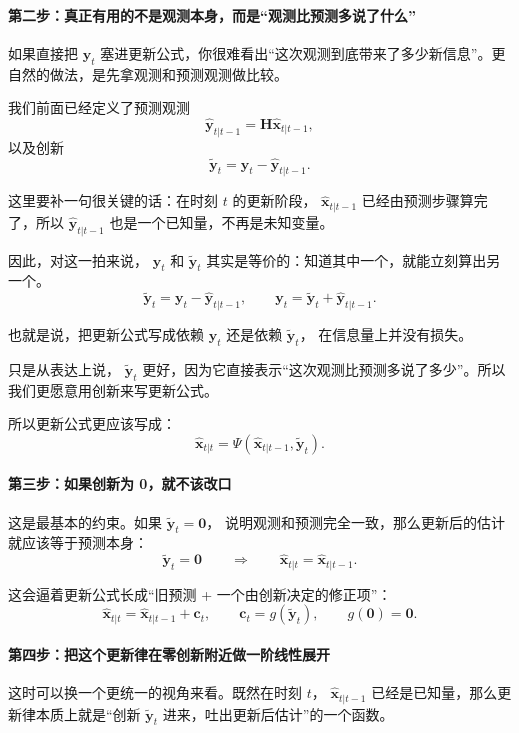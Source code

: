 \documentclass[12pt,a4paper]{ctexart}
\begin{document}
\paragraph{第二步：真正有用的不是观测本身，而是“观测比预测多说了什么”}

如果直接把
\(\bm{y}_t\)
塞进更新公式，你很难看出“这次观测到底带来了多少新信息”。更自然的做法，是先拿观测和预测观测做比较。

我们前面已经定义了预测观测
\[
\hat{\bm{y}}_{t|t-1} = \bm{H}\hat{\bm{x}}_{t|t-1},
\]
以及创新
\[
\tilde{\bm{y}}_t = \bm{y}_t - \hat{\bm{y}}_{t|t-1}.
\]

这里要补一句很关键的话：在时刻 \(t\) 的更新阶段，
\(\hat{\bm{x}}_{t|t-1}\)
已经由预测步骤算完了，所以
\(\hat{\bm{y}}_{t|t-1}\)
也是一个已知量，不再是未知变量。

因此，对这一拍来说，
\(\bm{y}_t\)
和
\(\tilde{\bm{y}}_t\)
其实是等价的：知道其中一个，就能立刻算出另一个。
\[
\tilde{\bm{y}}_t = \bm{y}_t - \hat{\bm{y}}_{t|t-1},
\qquad
\bm{y}_t = \tilde{\bm{y}}_t + \hat{\bm{y}}_{t|t-1}.
\]

也就是说，把更新公式写成依赖
\(\bm{y}_t\)
还是依赖
\(\tilde{\bm{y}}_t\)，
在信息量上并没有损失。

只是从表达上说，
\(\tilde{\bm{y}}_t\)
更好，因为它直接表示“这次观测比预测多说了多少”。所以我们更愿意用创新来写更新公式。

所以更新公式更应该写成：
\[
\hat{\bm{x}}_{t|t} = \Psi(\hat{\bm{x}}_{t|t-1}, \tilde{\bm{y}}_t).
\]

\paragraph{第三步：如果创新为 0，就不该改口}

这是最基本的约束。如果
\(\tilde{\bm{y}}_t=\bm{0}\)，
说明观测和预测完全一致，那么更新后的估计就应该等于预测本身：
\[
\tilde{\bm{y}}_t = \bm{0}
\qquad\Longrightarrow\qquad
\hat{\bm{x}}_{t|t} = \hat{\bm{x}}_{t|t-1}.
\]

这会逼着更新公式长成“旧预测 + 一个由创新决定的修正项”：
\[
\hat{\bm{x}}_{t|t}
= \hat{\bm{x}}_{t|t-1} + \bm{c}_t,
\qquad
\bm{c}_t = g(\tilde{\bm{y}}_t),
\qquad
g(\bm{0})=\bm{0}.
\]

\paragraph{第四步：把这个更新律在零创新附近做一阶线性展开}

这时可以换一个更统一的视角来看。既然在时刻 \(t\)，
\(\hat{\bm{x}}_{t|t-1}\)
已经是已知量，那么更新律本质上就是“创新 \(\tilde{\bm{y}}_t\) 进来，吐出更新后估计”的一个函数。
\end{document}
